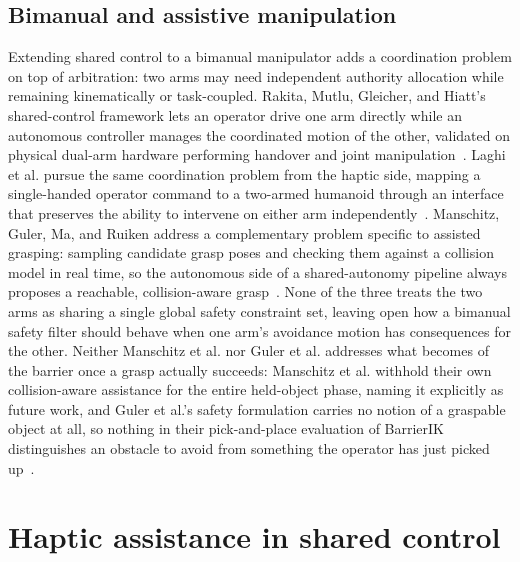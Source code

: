 \subsection{Bimanual and assistive manipulation}
\label{sec:sota-bimanual}

Extending shared control to a bimanual manipulator adds a coordination problem on top of arbitration: two arms may need independent authority allocation while remaining kinematically or task-coupled. Rakita, Mutlu, Gleicher, and Hiatt's shared-control framework lets an operator drive one arm directly while an autonomous controller manages the coordinated motion of the other, validated on physical dual-arm hardware performing handover and joint manipulation~\cite{rakita2019bimanual}. Laghi et al. pursue the same coordination problem from the haptic side, mapping a single-handed operator command to a two-armed humanoid through an interface that preserves the ability to intervene on either arm independently~\cite{laghi2018bimanual}. Manschitz, Guler, Ma, and Ruiken address a complementary problem specific to assisted grasping: sampling candidate grasp poses and checking them against a collision model in real time, so the autonomous side of a shared-autonomy pipeline always proposes a reachable, collision-aware grasp~\cite{manschitz2025samplinggrasp}. None of the three treats the two arms as sharing a single global safety constraint set, leaving open how a bimanual safety filter should behave when one arm's avoidance motion has consequences for the other. Neither Manschitz et al. nor Guler et al. addresses what becomes of the barrier once a grasp actually succeeds: Manschitz et al. withhold their own collision-aware assistance for the entire held-object phase, naming it explicitly as future work, and Guler et al.'s safety formulation carries no notion of a graspable object at all, so nothing in their pick-and-place evaluation of BarrierIK distinguishes an obstacle to avoid from something the operator has just picked up~\cite{guler2026barrierik}.

\section{Haptic assistance in shared control}
\label{sec:sota-haptic-fixtures}

